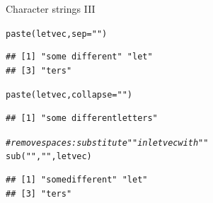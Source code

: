 \documentclass[xcolor=table,       handout,    xcolor=dvipsnames]{beamer}\usepackage[]{graphicx}\usepackage[]{color}
\makeatletter
\newcommand{\hlstr}[1]{\textcolor[rgb]{0.545,0.137,0.137}{#1}}
\newcommand{\hlcom}[1]{\textcolor[rgb]{0,0.392,0}{\textit{#1}}}
\newcommand{\hlstd}[1]{\textcolor[rgb]{0,0,0}{#1}}
\newcommand{\hlkwc}[1]{\textcolor[rgb]{1,0,1}{#1}}
\newcommand{\hlkwd}[1]{\textcolor[rgb]{0,0,1}{#1}}
\newenvironment{kframe}{%
 \def\at@end@of@kframe{}%
 \ifinner\ifhmode%
  \def\at@end@of@kframe{\end{minipage}}%
  \begin{minipage}{\columnwidth}%
 \fi\fi%
 \def\FrameCommand##1{\hskip\@totalleftmargin \hskip-\fboxsep
 \colorbox{shadecolor}{##1}\hskip-\fboxsep
     \hskip-\linewidth \hskip-\@totalleftmargin \hskip\columnwidth}%
 \MakeFramed {\advance\hsize-\width
   \@totalleftmargin\z@ \linewidth\hsize
   \@setminipage}}%
 {\par\unskip\endMakeFramed%
 \at@end@of@kframe}
\newenvironment{knitrout}{}{} %
\makeatother
\begin{document}
\begin{frame}[fragile]{Character strings III}
\begin{knitrout}
\color{fgcolor}\begin{kframe}
\begin{alltt}
\hlkwd{paste}\hlstd{(letvec,} \hlkwc{sep}\hlstd{=}\hlstr{""}\hlstd{)}
\end{alltt}
\begin{verbatim}
## [1] "some different" "let"           
## [3] "ters"
\end{verbatim}
\begin{alltt}
\hlkwd{paste}\hlstd{(letvec,} \hlkwc{collapse}\hlstd{=}\hlstr{""}\hlstd{)}
\end{alltt}
\begin{verbatim}
## [1] "some differentletters"
\end{verbatim}
\begin{alltt}
\hlcom{# remove spaces: substitute " " in letvec with ""}
\hlkwd{sub}\hlstd{(}\hlstr{" "}\hlstd{,} \hlstr{""}\hlstd{, letvec)}
\end{alltt}
\begin{verbatim}
## [1] "somedifferent" "let"          
## [3] "ters"
\end{verbatim}
\end{kframe}
\end{knitrout}
\end{frame}

\end{document}
